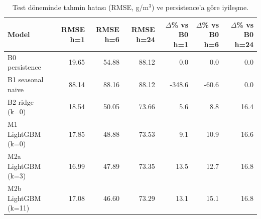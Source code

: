 \begin{table}[t]
\caption{Test döneminde tahmin hatası (RMSE, \textmu g/m$^3$) ve persistence'a göre iyileşme.}
\label{tab:rq1_main}
\centering\footnotesize
\begin{tabular}{lrrrrrr}
\toprule
Model & RMSE h=1 & RMSE h=6 & RMSE h=24 & $\Delta$\% vs B0 h=1 & $\Delta$\% vs B0 h=6 & $\Delta$\% vs B0 h=24 \\
\midrule
B0 persistence & 19.65 & 54.88 & 88.12 & 0.0 & 0.0 & 0.0 \\
B1 seasonal naive & 88.14 & 88.16 & 88.12 & -348.6 & -60.6 & 0.0 \\
B2 ridge (k=0) & 18.54 & 50.05 & 73.66 & 5.6 & 8.8 & 16.4 \\
M1 LightGBM (k=0) & 17.85 & 48.88 & 73.53 & 9.1 & 10.9 & 16.6 \\
M2a LightGBM (k=3) & 16.99 & 47.89 & 73.35 & 13.5 & 12.7 & 16.8 \\
M2b LightGBM (k=11) & 17.08 & 46.60 & 73.29 & 13.1 & 15.1 & 16.8 \\
\bottomrule
\end{tabular}
\end{table}
